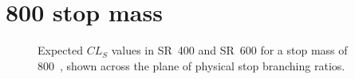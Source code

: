 \FloatBarrier

\newpage
\section{800 \texorpdfstring{\GeV}{GeV} stop mass}

\begin{figure}[ht]
  \centering
  \caption{
    Expected $CL_S$ values in SR~400 and SR~600 for a stop mass of 800~\GeV,
    shown across the plane of physical stop branching ratios.
  }
\end{figure}

